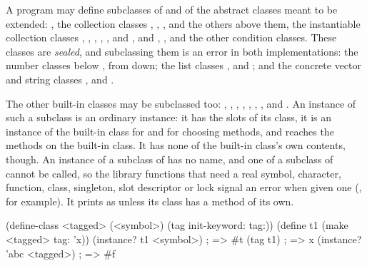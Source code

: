 A program may define subclasses of  and of the abstract
classes meant to be extended: , the collection classes
, , ,
 and the others above them, the
instantiable collection classes , ,
, , , 
and , and , ,
 and the other condition classes. These classes are
\emph{sealed}, and subclassing them is an error in both implementations:
the number classes below , from  down;
the list classes ,  and ; and
the concrete vector and string classes ,
 and .

The other built-in classes may be subclassed too: ,
, , ,
, , ,
 and . An instance of such a
subclass is an ordinary instance: it has the slots of its class, it is an
instance of the built-in class for  and for choosing
methods, and  reaches the methods on the built-in
class. It has none of the built-in class's own contents, though. An
instance of a subclass of  has no name, and one of a
subclass of  cannot be called, so the library functions
that need a real symbol, character, function, class, singleton, slot
descriptor or lock signal an error when given one
(, for example). It prints
as  unless its class has a
 method of its own.

\begin{dylan}
(define-class <tagged> (<symbol>) (tag init-keyword: tag:))
(define t1 (make <tagged> tag: 'x))
(instance? t1 <symbol>)        ; => #t
(tag t1)                       ; => x
(instance? 'abc <tagged>)      ; => #f
\end{dylan}
